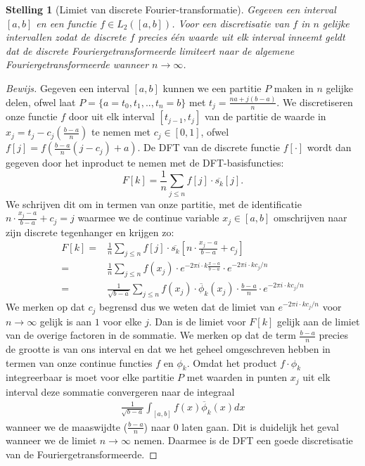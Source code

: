 \documentclass[11pt]{report}
\theoremstyle{plain}
\newtheorem*{stelling}{Stelling}
\theoremstyle{remark}
\newcommand{\eq}[1]{\begin{eqnarray*} #1 \end{eqnarray*}}
\newcommand{\dpii}{{2\pi i}}
\begin{document}
\begin{stelling}[Limiet van discrete Fourier-transformatie]
  Gegeven een interval $[a,b]$ en een functie $f\in L_2([a,b])$. 
  Voor een discretisatie van $f$ in $n$ gelijke
  intervallen zodat de discrete $f$ precies \'e\'en waarde uit elk interval inneemt geldt dat de discrete
  Fouriergetransformeerde limiteert naar de algemene Fouriergetransformeerde wanneer $n\to\infty$.
\end{stelling} 
\begin{proof}[Bewijs]
Gegeven een interval $[a,b]$ kunnen we een partitie $P$ maken in $n$ gelijke delen, ofwel laat $P=\{a=t_0,t_1,..,t_n=b\}$ met $t_j = \tfrac{na + j(b-a)}{n}$.
We discretiseren onze functie $f$ door uit elk interval $[t_{j-1},t_{j}]$ van de partitie de waarde in $x_j = t_j - c_j(\tfrac{b-a}{n})$ te nemen met $c_j \in [0,1]$, ofwel
$f[j] = f(\frac{b-a}{n}(j-c_j) + a)$.
De DFT van de discrete functie $f[\cdot]$ wordt dan gegeven door het inproduct te nemen met de DFT-basisfuncties:
\[
F[k] = \frac1n\sum_{j\leq n} f[j] \cdot \overline{s_k}[j].
\]
We schrijven dit om in termen van onze partitie, met de identificatie $n\cdot\tfrac{x_j-a}{b-a} + c_j= j$ 
waarmee we de continue variable $x_j\in[a,b]$ omschrijven naar zijn discrete tegenhanger en krijgen zo:
\eq{
  F[k] =& \frac{1}{n} \sum_{j \leq n} f[j]\cdot \overline{s_k}[n\cdot\tfrac{x_j-a}{b-a} + c_j] \\
       =& \frac{1}{n} \sum_{j \leq n} f(x_j)\cdot 
       e^{-\dpii \cdot k \tfrac{x-a}{b-a}} \cdot e^{-\dpii \cdot k c_j/n} \\
       =&  \frac{1}{\sqrt{b-a}}\sum_{j \leq n} f(x_j)\cdot \overline{\phi}_k(x_j) \cdot\frac{b-a}{n} 
\cdot e^{-\dpii \cdot k c_j/n}
}
We merken op dat $c_j$ begrensd dus we weten dat de limiet van 
$e^{-\dpii\cdot k c_j/n}$ voor $n\to\infty$ gelijk is aan $1$ voor elke $j$. 
Dan is de limiet voor $F[k]$ gelijk aan de limiet van de overige factoren in de sommatie.
We merken op dat de term $\frac{b-a}{n}$ precies de grootte is van ons interval en dat we het geheel
omgeschreven hebben in termen van onze continue functies $f$ en $\phi_k$.
Omdat het product $f\cdot\phi_k$ integreerbaar is moet voor elke partitie $P$ met 
waarden in punten $x_j$ uit elk interval deze sommatie convergeren naar de integraal
\eq{
  \frac{1}{\sqrt{b-a}} \int_{[a,b]} f(x) \overline{\phi}_k(x) dx
}
wanneer we de maaswijdte ($\tfrac{b-a}{n}$) naar $0$ laten gaan. Dit is duidelijk het geval wanneer we de limiet $n\to\infty$ nemen. Daarmee is de DFT een goede discretisatie van de Fouriergetransformeerde. 
\end{proof}
 
\end{document}
